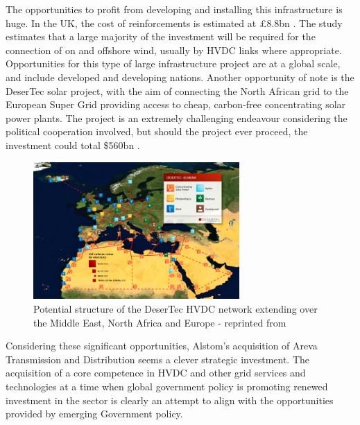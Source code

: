 The opportunities to profit from developing and installing this infrastructure is huge.
In the UK, the cost of reinforcements is estimated at \pounds8.8bn \cite{NetworkStrategyGroup}. 
The study estimates that a large majority of the investment will be required for the connection of on and offshore wind, usually by HVDC links where appropriate.
Opportunities for this type of large infrastructure project are at a global scale, and include developed and developing nations.
Another opportunity of note is the DeserTec solar project, with the aim of connecting the North African grid to the European Super Grid providing access to cheap, carbon-free concentrating solar power plants. 
The project is an extremely challenging endeavour considering the political cooperation involved, but should the project ever proceed, the investment could total \$560bn \cite{DesertTec}.

\begin{figure}[!h]
\centering
\includegraphics[width = 0.7\textwidth]{Figures/Desertec.jpg}
\caption{Potential structure of the DeserTec HVDC network extending over the Middle East, North Africa and Europe - reprinted from \cite{DesertTec}}
\label{figure:Desertec}
\end{figure}

Considering these significant opportunities, Alstom's acquisition of Areva Transmission and Distribution seems a clever strategic investment.
The acquisition of a core competence in HVDC and other grid services and technologies at a time when global government policy is promoting renewed investment in the sector is clearly an attempt to align with the opportunities provided by emerging Government policy.





